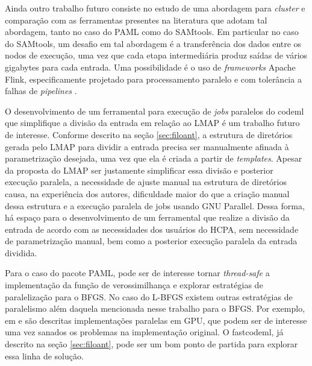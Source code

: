 \documentclass[cic,tc]{iiufrgs}
\begin{document}
Ainda outro trabalho futuro consiste no estudo de uma abordagem para
\textit{cluster} e comparação com as ferramentas presentes na literatura que
adotam tal abordagem, tanto no caso do PAML como do SAMtools. Em particular no
caso do SAMtools, um desafio em tal abordagem é a transferência dos dados entre
os nodos de execução, uma vez que cada etapa intermediária produz saídas de
vários gigabytes para cada entrada. Uma possibilidade é o uso de
\textit{frameworks} Apache Flink, especificamente projetado para processamento
paralelo e com tolerância a falhas de \textit{pipelines} \cite{carbone2015apache}.

O desenvolvimento de um ferramental para execução de \textit{jobs} paralelos do
codeml que simplifique a divisão da entrada em relação ao LMAP é um trabalho
futuro de interesse. Conforme descrito na seção \ref{sec:filoant}, a estrutura
de diretórios gerada pelo LMAP para dividir a entrada precisa ser manualmente
afinada à parametrização desejada, uma vez que ela é criada a partir de
\textit{templates}. Apesar da proposta do LMAP ser justamente simplificar essa
divisão e posterior execução paralela, a necessidade de ajuste manual na
estrutura de diretórios causa, na experiência dos autores, dificuldade maior do
que a criação manual dessa estrutura e a execução paralela de jobs usando GNU
Parallel. Dessa forma, há espaço para o desenvolvimento de um ferramental que
realize a divisão da entrada de acordo com as necessidades dos usuários do
HCPA, sem necessidade de parametrização manual, bem como a posterior execução
paralela da entrada dividida.

Para o caso do pacote PAML, pode ser de interesse tornar \textit{thread-safe} a
implementação da função de verossimilhança e explorar estratégias de
paralelização para o BFGS. No caso do L-BFGS existem outras estratégias de
paralelismo além daquela mencionada nesse trabalho para o BFGS. Por exemplo, em
\cite{fei2014parallel} e \cite{sanseverino2014cuda} são descritas
implementações paralelas em GPU, que podem ser de interesse uma vez sanados os
problemas na implementação original. O fastcodeml, já descrito na seção
\ref{sec:filoant}, pode ser um bom ponto de partida para explorar essa linha de
solução.

%
%
%
%



\end{document}
